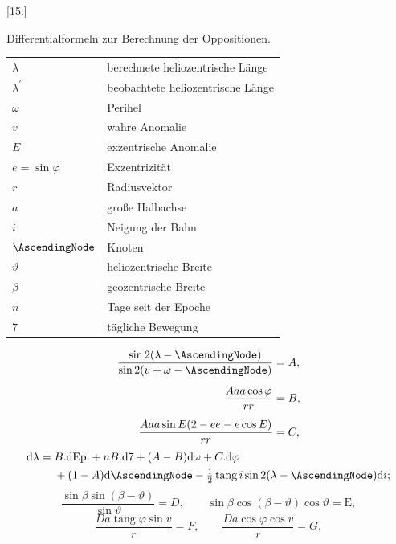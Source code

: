 \hypertarget{native-317-zusatz15}{}
\begin{center}
[15.]
\end{center}
\begin{center}
Differentialformeln zur Berechnung der Oppositionen.
\end{center}
\begin{center}
\begin{tabular}{@{}ll@{}}
\(\lambda\) & berechnete heliozentrische Länge\\
\(\lambda^{\prime}\) & beobachtete heliozentrische Länge\\
\(\omega\) & Perihel\\
\(v\) & wahre Anomalie\\
\(E\) & exzentrische Anomalie\\
\(e=\sin\varphi\) & Exzentrizität\\[5pt]
\(r\) & Radiusvektor\\
\(a\) & große Halbachse\\
\(i\) & Neigung der Bahn\\
\(\AscendingNode\) & Knoten\\
\(\vartheta\) & heliozentrische Breite\\
\(\beta\) & geozentrische Breite\\[5pt]
\(n\) & Tage seit der Epoche\\
\(\mathord{7}\) & tägliche Bewegung
\end{tabular}
\end{center}
\[
\begin{aligned}
\frac{\sin2(\lambda-\AscendingNode)}{\sin2(v+\omega-\AscendingNode)}&=A,\\[5pt]
\frac{Aaa\cos\varphi}{rr}&=B,\\[5pt]
\frac{Aaa\sin E(2-ee-e\cos E)}{rr}&=C,
\end{aligned}
\]
\[
\begin{aligned}
\mathrm{d}\lambda={}&B\mathord{.}\mathrm{dEp.}+nB\mathord{.}\mathrm{d}\mathord{7}+(A-B)\mathrm{d}\omega+C\mathord{.}\mathrm{d}\varphi\\
&+(1-A)\mathrm{d}\AscendingNode-\tfrac12\operatorname{tang}i\sin2(\lambda-\AscendingNode)\mathrm{d}i;
\end{aligned}
\]
\[
\frac{\sin\beta\sin(\beta-\vartheta)}{\sin\vartheta}=D,\qquad
\sin\beta\cos(\beta-\vartheta)\cos\vartheta=\mathrm{E},
\]
\[
\frac{Da\operatorname{tang}\varphi\sin v}{r}=F,\qquad
\frac{Da\cos\varphi\cos v}{r}=G,
\]
